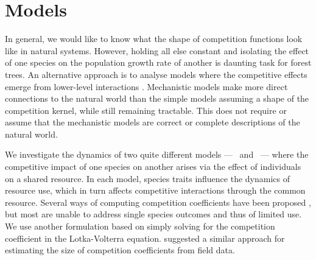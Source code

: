 \documentclass[a4paper,11pt]{article}
\begin{document}
\section{Models}

In general, we would like to know what the shape of competition
functions look like in natural systems.  However, holding all else
constant and isolating the effect of one species on the population
growth rate of another is daunting task for forest trees.
An alternative approach is to analyse models where the competitive
effects emerge from lower-level interactions
\citep[e.g.,][]{Draghi-2012}.  Mechanistic models make more direct
connections to the natural world than the simple models assuming a
shape of the competition kernel,
while still remaining tractable.  This does not require or assume that
the mechanistic models are correct or complete descriptions of the
natural world.

We investigate the dynamics of two quite different models --- \plant\
and \Rstar\ --- where the competitive impact of one species on another
arises via the effect of individuals on a shared resource.
%
In each model, species traits influence the dynamics of resource use,
which in turn affects competitive interactions through the common
resource.  Several ways of computing competition coefficients have been
proposed \citep[e.g.,][]{Abrams-1987,Abrams-2008}, but most are unable
to address single species outcomes and thus of limited use.
We use another formulation
based on simply solving for the competition coefficient in the
Lotka-Volterra equation. \citet{Ricklefs-1973} suggested a similar approach
for estimating the size of competition coefficients from field data.
\end{document}

